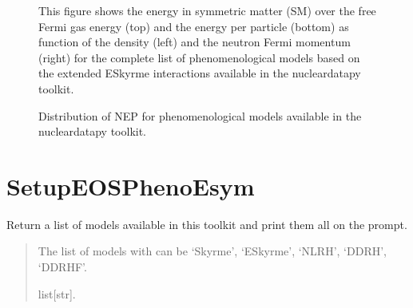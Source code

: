 \documentclass[letterpaper,10pt,english]{sphinxmanual}
\begin{document}
\begin{figure}[htbp]
\centering
\capstart

\noindent{}
\caption{This figure shows the energy in symmetric matter (SM) over the free Fermi gas energy (top) and the energy per particle (bottom) as function of the density (left) and the neutron Fermi momentum (right) for the complete list of phenomenological models based on the extended ESkyrme interactions available in the nucleardatapy toolkit.}\label{\detokenize{source/api/setup_matter_pheno:id10}}\end{figure}

\begin{figure}[htbp]
\centering
\capstart

\noindent{}
\caption{Distribution of NEP for phenomenological models available in the nucleardatapy toolkit.}\label{\detokenize{source/api/setup_matter_pheno:id11}}\end{figure}

\sphinxstepscope


\section{SetupEOSPhenoEsym}
\label{\detokenize{source/api/setup_matter_pheno_esym:setupeosphenoesym}}\label{\detokenize{source/api/setup_matter_pheno_esym::doc}}\label{\detokenize{source/api/setup_matter_pheno_esym:module-nucleardatapy.matter.setup_pheno_esym}}

\begin{fulllineitems}
\label{\detokenize{source/api/setup_matter_pheno_esym:nucleardatapy.matter.setup_pheno_esym.pheno_esym_models}}
\pysigstartsignatures
{}
\pysigstopsignatures
\sphinxAtStartPar
Return a list of models available in this toolkit and print them all on the prompt.
\begin{quote}\begin{description}
\sphinxAtStartPar
The list of models with can be ‘Skyrme’, ‘ESkyrme’, ‘NLRH’, ‘DDRH’, ‘DDRHF’.

\sphinxAtStartPar
list{[}str{]}.

\end{description}\end{quote}

\end{fulllineitems}
\end{document}
